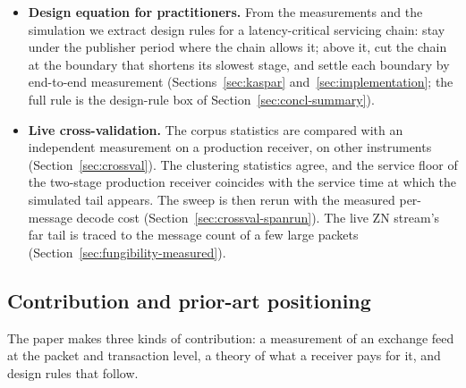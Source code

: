 \documentclass[11pt]{article}
\begin{document}
\begin{itemize}
(Section~\ref{sec:setup-sweep}); the null isolates the contribution of clustering, and
is not a model of what any designer assumes. Section~\ref{sec:setup-nulls} adds seven
further streams that remove the ingredients of the clustering one at a time, at the
packet level and at the level of matching-engine transactions.
    \item \textbf{Design equation for practitioners.} From the measurements and the
simulation we extract design rules for a latency-critical servicing chain: stay under the
publisher period where the chain allows it; above it, cut the chain at the boundary that
shortens its slowest stage, and settle each boundary by end-to-end measurement
(Sections~\ref{sec:kaspar} and~\ref{sec:implementation}; the full rule is the
design-rule box of Section~\ref{sec:concl-summary}).
    \item \textbf{Live cross-validation.} The corpus statistics are compared with an
independent measurement on a production receiver, on other instruments
(Section~\ref{sec:crossval}). The clustering statistics agree, and the service floor of
the two-stage production receiver coincides with the service time at which the simulated
tail appears. The sweep is
then rerun with the measured per-message decode cost
(Section~\ref{sec:crossval-spanrun}). The live ZN stream's far tail is traced to the
message count of a few large packets (Section~\ref{sec:fungibility-measured}).
\end{itemize}

\subsection{Contribution and prior-art positioning}
\label{sec:intro-priors}

The paper makes three kinds of contribution: a measurement of an exchange feed at the
packet and transaction level, a theory of what a receiver pays for it, and design rules
that follow.
\end{document}
